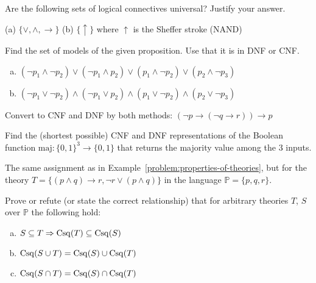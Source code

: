 \begin{problem} 
    
    Are the following sets of logical connectives universal? Justify your answer.
     
    (a) $\{\vee, \wedge, \rightarrow\}$ \hfill (b) $\{\uparrow\}$ where $\uparrow$ is the Sheffer stroke (NAND)

\end{problem}


\begin{problem} 
        
    Find the set of models of the given proposition. Use that it is in DNF or CNF.
    \begin{enumerate}[(a)]
        \item $(\neg p_1 \wedge \neg p_2)\vee( \neg p_1 \wedge p_2)\vee( p_1 \wedge \neg p_2)\vee( p_2 \wedge \neg p_3)$
        \item $(\neg p_1 \vee \neg p_2)\wedge( \neg p_1 \vee p_2)\wedge( p_1 \vee \neg p_2)\wedge( p_2 \vee \neg p_3)$
    \end{enumerate}

\end{problem}


\begin{problem} 
    
    Convert to CNF and DNF by both methods: $(\neg p \to (\neg q \to r))\to p$
    
\end{problem}


\begin{problem} 
    
    Find the (shortest possible) CNF and DNF representations of the Boolean function $\mathrm{maj}\colon\{0,1\}^3\to \{0,1\}$ that returns the majority value among the 3 inputs.

\end{problem}


\begin{problem}
    
    The same assignment as in Example~\ref{problem:properties-of-theories}, but for the theory $T=\{(p\wedge q)\to r, \neg r\vee(p\wedge q)\}$ in the language $\mathbb P=\{p,q,r\}$.
    
\end{problem}


\begin{problem}
    
    Prove or refute (or state the correct relationship) that for arbitrary theories $T$, $S$ over $\mathbb{P}$ the following hold:
    \begin{enumerate}[(a)]
        \item $S\subseteq T \Rightarrow \operatorname{Csq}(T) \subseteq \operatorname{Csq}(S)$
        \item $\operatorname{Csq}(S\cup T)=\operatorname{Csq}(S) \cup \operatorname{Csq}(T)$
        \item $\operatorname{Csq}(S\cap T)=\operatorname{Csq}(S) \cap \operatorname{Csq}(T)$
    \end{enumerate}

\end{problem}


